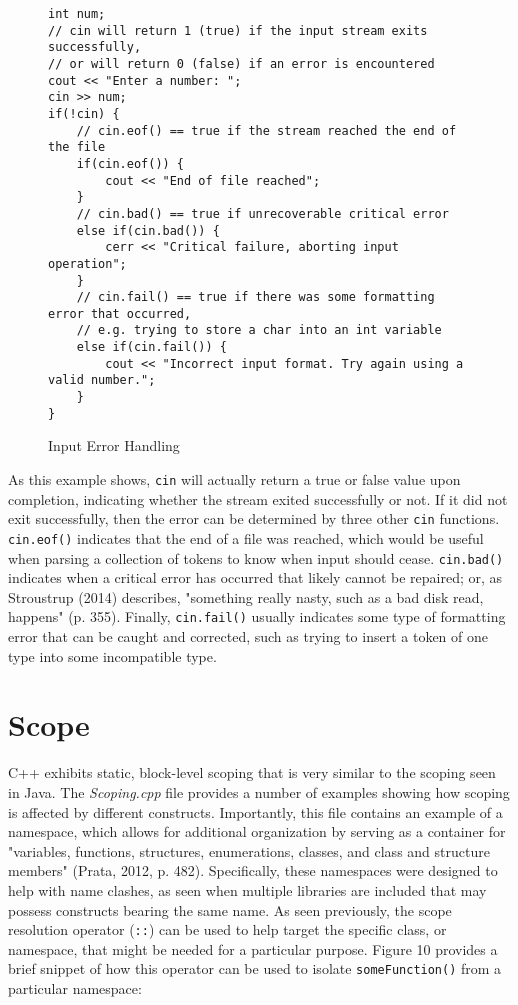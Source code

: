 \documentclass[11pt]{article}
\begin{document}
\begin{figure}[!h]
\centering
\begin{BVerbatim}
int num;
// cin will return 1 (true) if the input stream exits successfully,
// or will return 0 (false) if an error is encountered
cout << "Enter a number: ";
cin >> num;
if(!cin) {
	// cin.eof() == true if the stream reached the end of the file
	if(cin.eof()) {
		cout << "End of file reached";
	}
	// cin.bad() == true if unrecoverable critical error
	else if(cin.bad()) {
		cerr << "Critical failure, aborting input operation";
	}
	// cin.fail() == true if there was some formatting error that occurred,
	// e.g. trying to store a char into an int variable
	else if(cin.fail()) {
		cout << "Incorrect input format. Try again using a valid number.";
	}
}
\end{BVerbatim}
\caption{Input Error Handling}
\end{figure} \FloatBarrier

\noindent
As this example shows, \texttt{cin} will actually return a true or false value upon completion, indicating whether the stream exited successfully or not.  If it did not exit successfully, then the error can be determined by three other \texttt{cin} functions.  \texttt{cin.eof()} indicates that the end of a file was reached, which would be useful when parsing a collection of tokens to know when input should cease.  \texttt{cin.bad()} indicates when a critical error has occurred that likely cannot be repaired; or, as Stroustrup (2014) describes, "something really nasty, such as a bad disk read, happens" (p. 355).  Finally, \texttt{cin.fail()} usually indicates some type of formatting error that can be caught and corrected, such as trying to insert a token of one type into some incompatible type.

\section{Scope}
C++ exhibits static, block-level scoping that is very similar to the scoping seen in Java.  The \textit{Scoping.cpp} file provides a number of examples showing how scoping is affected by different constructs.  Importantly, this file contains an example of a namespace, which allows for additional organization by serving as a container for "variables, functions, structures, enumerations, classes, and class and structure members" (Prata, 2012, p. 482).  Specifically, these namespaces were designed to help with name clashes, as seen when multiple libraries are included that may possess constructs bearing the same name.  As seen previously, the scope resolution operator (\texttt{::}) can be used to help target the specific class, or namespace, that might be needed for a particular purpose.  Figure 10 provides a brief snippet of how this operator can be used to isolate \texttt{someFunction()} from a particular namespace:
	
\end{document}
